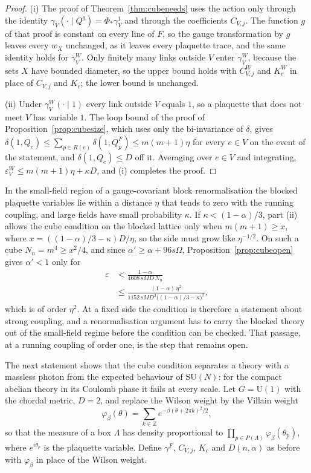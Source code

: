 \documentclass[11pt]{amsart}
\theoremstyle{definition}
\theoremstyle{remark}
\numberwithin{equation}{section}
\newcommand{\Z}{\mathbb{Z}}
\newcommand{\SU}{\mathrm{SU}}
\newcommand{\U}{\mathrm{U}}
\begin{document}
\begin{proof}
(i) The proof of Theorem~\ref{thm:cubeneeds} uses the action only through
the identity $\gamma_V(\cdot\mid Q^g)=\Phi_*\gamma^1_V$ and through the
coefficients $C_{V,j}$. The function $g$ of that proof is constant on every
line of $F$, so the gauge transformation by $g$ leaves every $w_X$
unchanged, as it leaves every plaquette trace, and the same identity holds
for $\gamma^W_V$. Only finitely many links outside $V$ enter $\gamma^W_V$,
because the sets $X$ have bounded diameter, so the upper bound holds with
$C^W_{V,j}$ and $K^W_c$ in place of $C_{V,j}$ and $K_c$; the lower bound is
unchanged.

(ii) Under $\gamma^W_V(\cdot\mid1)$ every link outside $V$ equals $1$, so a
plaquette that does not meet $V$ has variable $1$. The loop bound of the
proof of Proposition~\ref{prop:cubesize}, which uses only the bi-invariance
of $\delta$, gives $\delta(1,Q_e)\le\sum_{p\in R(e)}\delta(1,Q^F_p)\le
m(m+1)\eta$ for every $e\in V$ on the event of the statement, and
$\delta(1,Q_e)\le D$ off it. Averaging over $e\in V$ and integrating,
$\varepsilon^W_V\le m(m+1)\eta+\kappa D$, and (i) completes the proof.
\end{proof}

In the small-field region of a gauge-covariant block renormalisation the
blocked plaquette variables lie within a distance $\eta$ that tends to zero
with the running coupling, and large fields have small probability
$\kappa$. If $\kappa<(1-\alpha)/3$, part (ii) allows the cube condition on
the blocked lattice only when $m(m+1)\ge x$, where
$x=((1-\alpha)/3-\kappa)D/\eta$, so the side must grow like $\eta^{-1/2}$.
On such a cube $N_n=m^4\ge x^2/4$, and since $\alpha'\ge\alpha+96s\Omega$,
Proposition~\ref{prop:cubeopen} gives $\alpha'<1$ only for
\[
\begin{split}
\varepsilon&<\frac{1-\alpha}{4608\,sMD\,N_n}\\
&\le\frac{(1-\alpha)\,\eta^2}{1152\,sMD^3\bigl((1-\alpha)/3-\kappa\bigr)^2},
\end{split}
\]
which is of order $\eta^2$. At a fixed side the condition is therefore a
statement about strong coupling, and a renormalisation argument has to carry
the blocked theory out of the small-field regime before the condition can
be checked. That passage, at a running coupling of order one, is the step
that remains open.

The next statement shows that the cube condition separates a theory with a
massless photon from the expected behaviour of $\SU(N)$: for the compact
abelian theory in its Coulomb phase it fails at every scale. Let $G=\U(1)$
with the chordal metric, $D=2$, and replace the Wilson weight by the
Villain weight
\[
\varphi_\beta(\theta)=\sum_{k\in\Z}e^{-\beta(\theta+2\pi k)^2/2},
\]
so that the measure of a box $\Lambda$ has density proportional to
$\prod_{p\in P(\Lambda)}\varphi_\beta(\theta_p)$, where $e^{i\theta_p}$ is
the plaquette variable. Define $\gamma^F$, $C_{V,j}$, $K_c$ and $D(n,\alpha)$
as before with $\varphi_\beta$ in place of the Wilson weight.
\end{document}

